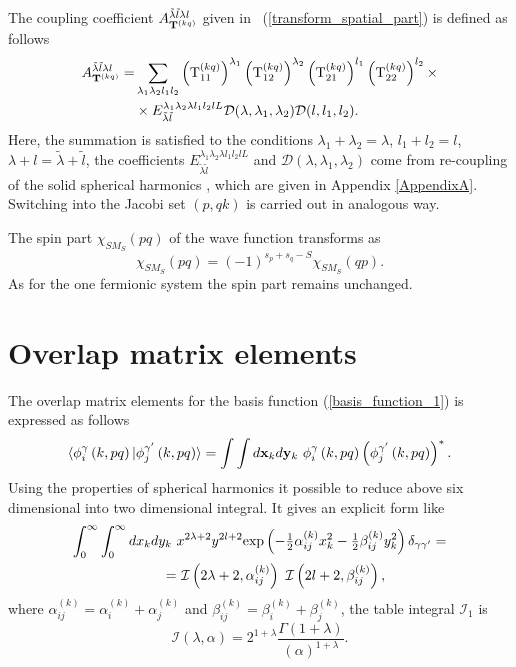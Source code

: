 \documentclass[
12pt, %
oneside, %
english, %
onehalfspacing, %
onehalfspacing, %
headsepline, %
]{MastersDoctoralThesis} %
\begin{document}
The coupling coefficient $A^{\tilde{\lambda} \tilde{l} \lambda l}_{{\bf T}^{(kq)} }$  given in ~(\ref{transform_spatial_part}) is defined as follows
 \begin{align}
 A^{\tilde{\lambda} \tilde{l} \lambda l}_{{\bf T}^{(kq)} } = & \sum_{\lambda_1 \lambda_2 l_1 l_2} 
\left({\rm T}_{11}^{(kq)} \right)^{\lambda_1} 
\left({\rm T}_{12}^{(kq)} \right)^{\lambda_2} 
\left({\rm T}_{21}^{(kq)} \right)^{l_1} 
\left({\rm T}_{22}^{(kq)} \right)^{l_2} 
\times \nonumber
\\
& \times {E}^{\lambda_1 \lambda_2 \lambda l_1 l_2 l L}_{\tilde{\lambda} \tilde{l} } \mathcal{D}(\lambda,\lambda_1,\lambda_2) \mathcal{D}(l,l_1,l_2).    
\label{trans_coef}
\end{align}
Here, the summation is satisfied to the conditions $\lambda_1+\lambda_2=\lambda$, $l_1+l_2=l$, $\lambda+l=\tilde{\lambda}+\tilde{l}$, the coefficients ${E}^{\lambda_1 \lambda_2 \lambda l_1 l_2 l L}_{\tilde{\lambda} \tilde{l} }$ and $\mathcal{D}(\lambda,\lambda_1,\lambda_2)$ come from re-coupling of the solid spherical harmonics , which are given in Appendix \ref{AppendixA}. Switching into the Jacobi set $(p,qk)$ is carried out in analogous way.

The spin part $\chi_{SM_S}(pq)$ of the wave function transforms as
\begin{equation}
\chi_{SM_S}(pq) = (-1)^{s_p+s_q-S} \chi_{SM_S}(qp).
\end{equation}
As for the one fermionic system the spin part remains unchanged.

\section{Overlap matrix elements}
The overlap matrix elements for the basis function (\ref{basis_function_1}) is expressed as follows
\begin{equation}
\langle \phi_{i}^{\gamma}\left(k, pq \right) \vert 
\phi_{j}^{\gamma^{\prime}}\left(k, pq \right) \rangle= \int \int d{\bf x}_k d{\bf y}_k ~\phi_{i}^{\gamma}\left(k, pq \right) \left( \phi_{j}^{\gamma^{\prime}}\left(k, pq \right) \right)^{*}.
\end{equation}
Using the properties of spherical harmonics it possible to reduce above six dimensional into two dimensional integral. It gives an explicit form like
\begin{align}
\int_0^\infty \int_0^\infty  dx_k dy_k~ & x^{2\lambda+2}y^{2 l +2} {\rm exp}\left( - \tfrac{1}{2}\alpha^{(k)}_{ij} x^2_k - \tfrac{1}{2} \beta^{(k)}_{ij} y^2_k \right) \delta_{\gamma \gamma'} =
 \\
=&~ \mathcal{I} \left( 2\lambda+2,\alpha_{ij}^{(k)} \right)~ \mathcal{I} \left(2l+2,\beta_{ij}^{(k)} \right) ,\nonumber
\end{align} 
where
$
\alpha_{ij}^{(k)}=\alpha_{i}^{(k)}+\alpha_{j}^{(k)}$ and $
\beta_{ij}^{(k)}=\beta_{i}^{(k)}+\beta_{j}^{(k)}
$,
the table integral $\mathcal{I}_1$ is  
\begin{equation}
\mathcal{I} \left( \lambda,\alpha\right)=
 2^{1+\lambda}\frac{\Gamma \left( 1+\lambda \right)  }{ \left( \alpha \right) ^{1+\lambda}} .
\label{table_integral_1}
\end{equation}
\end{document}
